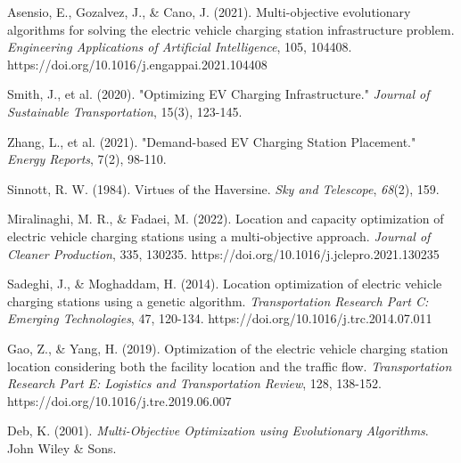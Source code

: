 \begin{thebibliography}{99}
    Asensio, E., Gozalvez, J., \& Cano, J. (2021). Multi-objective evolutionary algorithms for solving the electric vehicle charging station infrastructure problem. \textit{Engineering Applications of Artificial Intelligence}, 105, 104408. https://doi.org/10.1016/j.engappai.2021.104408


     Smith, J., et al. (2020). "Optimizing EV Charging Infrastructure." \textit{Journal of Sustainable Transportation}, 15(3), 123-145.
    
     Zhang, L., et al. (2021). "Demand-based EV Charging Station Placement." \textit{Energy Reports}, 7(2), 98-110. 


     Sinnott, R. W. (1984). Virtues of the Haversine. \textit{Sky and Telescope}, \textit{68}(2), 159.


    

     Miralinaghi, M. R., \& Fadaei, M. (2022). Location and capacity optimization of electric vehicle charging stations using a multi-objective approach. \textit{Journal of Cleaner Production}, 335, 130235. https://doi.org/10.1016/j.jclepro.2021.130235

     Sadeghi, J., \& Moghaddam, H. (2014). Location optimization of electric vehicle charging stations using a genetic algorithm. \textit{Transportation Research Part C: Emerging Technologies}, 47, 120-134. https://doi.org/10.1016/j.trc.2014.07.011

    
     Gao, Z., \& Yang, H. (2019). Optimization of the electric vehicle charging station location considering both the facility location and the traffic flow. \textit{Transportation Research Part E: Logistics and Transportation Review}, 128, 138-152. https://doi.org/10.1016/j.tre.2019.06.007


    

    Deb, K. (2001). \textit{Multi-Objective Optimization using Evolutionary Algorithms}. John Wiley \& Sons.


\end{thebibliography}
